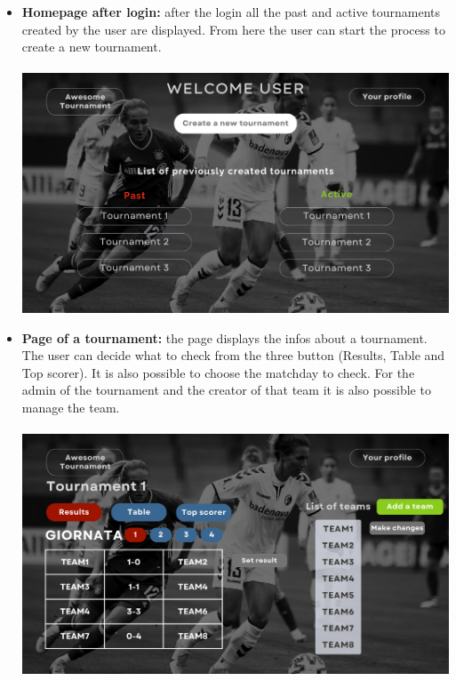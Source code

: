 \begin{itemize}
    \item \textbf{Homepage after login:} after the login all the past and active tournaments created by the user are displayed. From here the user can start the process to create a new tournament.\\\\
    \includegraphics[scale = 0.4]{sections/homepagelogin.png}

    \item \textbf{Page of a tournament:} the page displays the infos about a tournament. The user can decide what to check from the three button (Results, Table and Top scorer). It is also possible to choose the matchday to check. For the admin of the tournament and the creator of that team it is also possible to manage the team.\\\\
    \includegraphics[scale = 0.4]{sections/webpage.png}

\newpage


\end{itemize}
